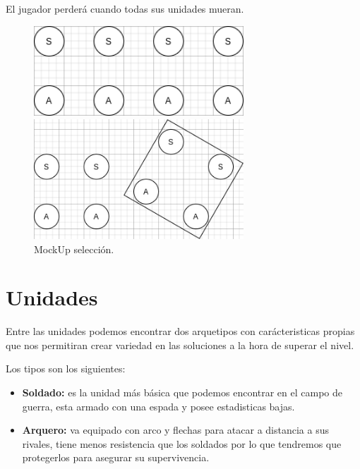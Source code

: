El jugador perderá cuando todas sus unidades mueran.


\begin{figure}[ht]
\centering
\begin{minipage}[c]{0.45\linewidth}
	\hspace{1cm}
	\includegraphics[width=0.7\textwidth]{imagenes/gdd/non-selection.png}
\end{minipage}
\begin{minipage}[c]{0.45\linewidth}
	\includegraphics[width=0.7\textwidth]{imagenes/gdd/selection.png}
\end{minipage}	
\caption{MockUp selección.}
\label{fig:unit-selec}
\end{figure}

\section{Unidades}
Entre las unidades podemos encontrar dos arquetipos con carácteristicas propias
que nos permitiran crear variedad en las soluciones a la hora de superar el
nivel.

Los tipos son los siguientes:
\begin{itemize}
	\item \textbf{Soldado:} es la unidad más básica que podemos encontrar en el campo de
							guerra, esta armado con una espada y posee estadisticas
							bajas.
	\item \textbf{Arquero:} va equipado con arco y flechas para atacar a distancia a
							sus rivales, tiene menos resistencia que los soldados por
							lo que tendremos que protegerlos para asegurar su
							supervivencia.
\end{itemize}

